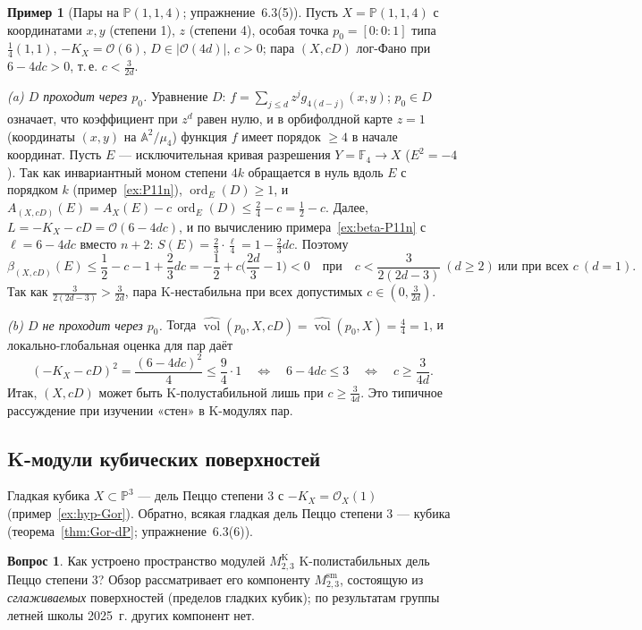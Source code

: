 \documentclass[11pt,a4paper]{article}
\theoremstyle{plain}
\theoremstyle{definition}
\newtheorem{example}[theorem]{Пример}
\newtheorem{question}[theorem]{Вопрос}
\theoremstyle{remark}
\newcommand{\PP}{\mathbb{P}}
\newcommand{\A}{\mathbb{A}}
\newcommand{\cO}{\mathcal{O}}
\DeclareMathOperator{\ord}{ord}
\DeclareMathOperator{\vol}{vol}
\newcommand{\hvol}{\widehat{\vol}}
\newcommand{\sm}{\mathrm{sm}}
\begin{document}
\begin{example}[Пары на $\PP(1,1,4)$; упражнение~6.3(5)]\label{ex:P114-pair}
Пусть $X=\PP(1,1,4)$ с координатами $x,y$ (степени 1), $z$ (степени 4), особая точка $p_0=[0:0:1]$
типа $\frac14(1,1)$, $-K_X=\cO(6)$, $D\in|\cO(4d)|$, $c>0$; пара $(X,cD)$ лог-Фано при $6-4dc>0$,
т.\,е. $c<\frac3{2d}$.

\emph{(a) $D$ проходит через $p_0$.} Уравнение $D$: $f=\sum_{j\le d}z^jg_{4(d-j)}(x,y)$;
$p_0\in D$ означает, что коэффициент при $z^d$ равен нулю, и в орбифолдной карте $z=1$
(координаты $(x,y)$ на $\A^2/\mu_4$) функция $f$ имеет порядок $\ge4$ в начале координат. Пусть
$E$ --- исключительная кривая разрешения $Y=\mathbb F_4\to X$ ($E^2=-4$). Так как инвариантный
моном степени $4k$ обращается в нуль вдоль $E$ с порядком $k$ (пример~\ref{ex:P11n}),
$\ord_E(D)\ge1$, и $A_{(X,cD)}(E)=A_X(E)-c\,\ord_E(D)\le\frac24-c=\frac12-c$. Далее, $L=-K_X-cD=\cO(6-4dc)$,
и по вычислению примера~\ref{ex:beta-P11n} с $\ell=6-4dc$ вместо $n+2$:
$S(E)=\frac23\cdot\frac{\ell}4=1-\frac23dc$. Поэтому
\[
\beta_{(X,cD)}(E)\le\frac12-c-1+\frac23dc=-\frac12+c\Big(\frac{2d}3-1\Big)<0
\quad\text{при}\quad c<\frac{3}{2(2d-3)}\ (d\ge2)\ \text{или при всех }c\ (d=1).
\]
Так как $\frac3{2(2d-3)}>\frac3{2d}$, пара K-нестабильна при всех допустимых $c\in(0,\frac3{2d})$.

\emph{(b) $D$ не проходит через $p_0$.} Тогда $\hvol(p_0,X,cD)=\hvol(p_0,X)=\frac44=1$, и
локально-глобальная оценка для пар даёт
\[
(-K_X-cD)^2=\frac{(6-4dc)^2}4\le\frac94\cdot1\quad\Longleftrightarrow\quad6-4dc\le3\quad\Longleftrightarrow\quad c\ge\frac3{4d}.
\]
Итак, $(X,cD)$ может быть K-полустабильной лишь при $c\ge\frac3{4d}$. Это типичное рассуждение
при изучении «стен» в K-модулях пар.
\end{example}

\subsection{K-модули кубических поверхностей}\label{ss:Kmoduli-cubic}

Гладкая кубика $X\subset\PP^3$ --- дель Пеццо степени 3 с $-K_X=\cO_X(1)$ (пример~\ref{ex:hyp-Gor}).
Обратно, всякая гладкая дель Пеццо степени 3 --- кубика (теорема~\ref{thm:Gor-dP}; упражнение~6.3(6)).

\begin{question}
Как устроено пространство модулей $M^{\mathrm K}_{2,3}$ K-полистабильных дель Пеццо степени 3?
Обзор рассматривает его компоненту $M^{\sm}_{2,3}$, состоящую из \emph{сглаживаемых} поверхностей
(пределов гладких кубик); по результатам группы летней школы 2025~г. других компонент нет.
\end{question}
\end{document}
